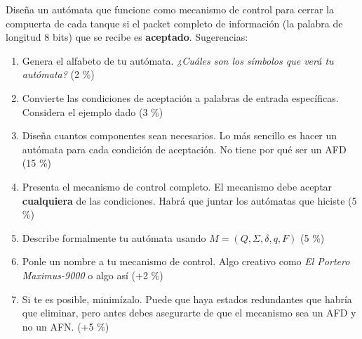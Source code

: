 \documentclass[]{book}
\theoremstyle{definition}
\begin{document}
Diseña un autómata que funcione como mecanismo de control para cerrar la compuerta de cada tanque si el packet completo de información (la palabra de longitud 8 bits) que se recibe es \textbf{aceptado}. Sugerencias:

\begin{enumerate}[label=\tt \alph*)]
    \itemsep0em
    \item Genera el alfabeto de tu autómata. \textit{¿Cuáles son los símbolos que verá tu autómata?} (2 \%)
    \item Convierte las condiciones de aceptación a palabras de entrada específicas. Considera el ejemplo dado (3 \%)
    \item Diseña cuantos componentes sean necesarios. Lo más sencillo es hacer un autómata para cada condición de aceptación. No tiene por qué ser un AFD (15 \%)
    \item Presenta el mecanismo de control completo. El mecanismo debe aceptar \textbf{cualquiera} de las condiciones. Habrá que juntar los autómatas que hiciste (5 \%)
    \item Describe formalmente tu autómata usando $M = (Q, \Sigma, \delta, q, F)$ (5 \%)
    \item Ponle un nombre a tu mecanismo de control. Algo creativo como \textit{El Portero Maximus-9000} o algo así (+2 \%)
    \item Si te es posible, minimízalo. Puede que haya estados redundantes que habría que eliminar, pero antes debes asegurarte de que el mecanismo sea un AFD y no un AFN. (+5 \%)
\end{enumerate}
\end{document}
